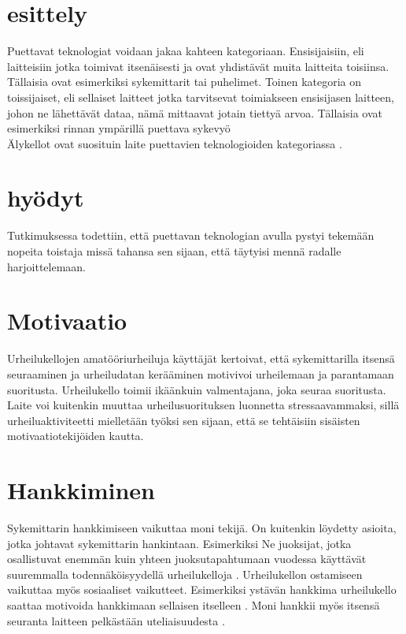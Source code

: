 \documentclass[12pt]{article}
\date{19.01.2022}
\author{Roni Koskinen}
\begin{document}
    \section{esittely}
    Puettavat teknologiat voidaan jakaa kahteen kategoriaan. Ensisijaisiin, eli laitteisiin jotka toimivat itsenäisesti
     ja ovat yhdistävät muita laitteita toisiinsa. Tällaisia ovat esimerkiksi sykemittarit tai puhelimet. Toinen kategoria
      on toissijaiset, eli sellaiset laitteet jotka tarvitsevat toimiakseen ensisijasen laitteen, johon ne lähettävät dataa, 
      nämä mittaavat jotain tiettyä arvoa. Tällaisia ovat esimerkiksi rinnan ympärillä puettava sykevyö \cite{godfrey2018z} \\

    Älykellot ovat suosituin laite puettavien teknologioiden kategoriassa \cite{siepmann_understanding_2021}.

    \section{hyödyt}
    Tutkimuksessa \cite{rapp_self-tracking_2020} todettiin, että puettavan teknologian avulla pystyi tekemään nopeita toistaja
     missä tahansa sen sijaan, että täytyisi mennä radalle harjoittelemaan.\\
    \section{Motivaatio}
    Urheilukellojen amatööriurheiluja käyttäjät kertoivat, että sykemittarilla itsensä seuraaminen ja urheiludatan kerääminen motivivoi urheilemaan ja parantamaan suoritusta.
     Urheilukello toimii ikäänkuin valmentajana, joka seuraa suoritusta. \cite{rapp_self-tracking_2020} Laite voi kuitenkin muuttaa urheilusuorituksen
      luonnetta stressaavammaksi, sillä urheiluaktiviteetti mielletään työksi sen sijaan, että se tehtäisiin sisäisten motivaatiotekijöiden kautta.
       \cite{rapp_self-tracking_2020}\\

    \section{Hankkiminen}
    Sykemittarin hankkimiseen vaikuttaa moni tekijä. On kuitenkin löydetty asioita, jotka johtavat sykemittarin hankintaan. Esimerkiksi Ne juoksijat, jotka osallistuvat 
     enemmän kuin yhteen juoksutapahtumaan vuodessa käyttävät suuremmalla todennäköisyydellä urheilukelloja \cite{janssen2017uses}. Urheilukellon ostamiseen vaikuttaa
      myös sosiaaliset vaikutteet. Esimerkiksi ystävän hankkima urheilukello saattaa motivoida hankkimaan sellaisen itselleen \cite{grinblatt_social_2008}.
       Moni hankkii myös itsensä seuranta laitteen pelkästään uteliaisuudesta \cite{baumgart2016role}.
\end{document}
